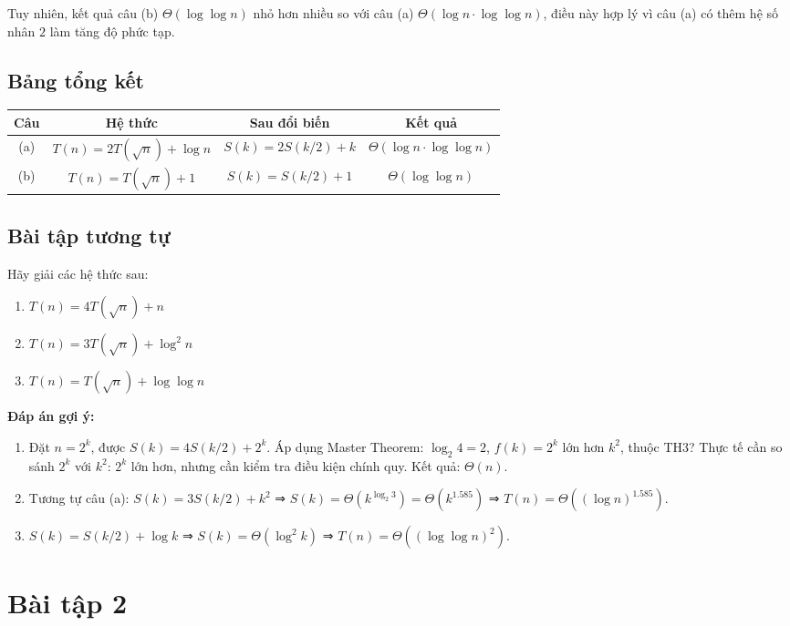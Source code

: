 \documentclass{article}
\begin{document}
Tuy nhiên, kết quả câu (b) \(\Theta(\log \log n)\) nhỏ hơn nhiều so với câu (a) \(\Theta(\log n \cdot \log \log n)\), điều này hợp lý vì câu (a) có thêm hệ số nhân \(2\) làm tăng độ phức tạp.

\subsection{Bảng tổng kết}

\begin{tabular}{|c|c|c|c|}
\hline
\textbf{Câu} & \textbf{Hệ thức} & \textbf{Sau đổi biến} & \textbf{Kết quả} \\
\hline
(a) & \(T(n) = 2T(\sqrt{n}) + \log n\) & \(S(k) = 2S(k/2) + k\) & \(\Theta(\log n \cdot \log \log n)\) \\
\hline
(b) & \(T(n) = T(\sqrt{n}) + 1\) & \(S(k) = S(k/2) + 1\) & \(\Theta(\log \log n)\) \\
\hline
\end{tabular}

\subsection{Bài tập tương tự}

Hãy giải các hệ thức sau:

\begin{enumerate}
    \item \(T(n) = 4T(\sqrt{n}) + n\)
    \item \(T(n) = 3T(\sqrt{n}) + \log^2 n\)
    \item \(T(n) = T(\sqrt{n}) + \log \log n\)
\end{enumerate}

\textbf{Đáp án gợi ý:}
\begin{enumerate}
    \item Đặt \(n = 2^k\), được \(S(k) = 4S(k/2) + 2^k\). Áp dụng Master Theorem: \(\log_2 4 = 2\), \(f(k) = 2^k\) lớn hơn \(k^2\), thuộc TH3? Thực tế cần so sánh \(2^k\) với \(k^2\): \(2^k\) lớn hơn, nhưng cần kiểm tra điều kiện chính quy. Kết quả: \(\Theta(n)\).
    \item Tương tự câu (a): \(S(k) = 3S(k/2) + k^2\) ⇒ \(S(k) = \Theta(k^{\log_2 3}) = \Theta(k^{1.585})\) ⇒ \(T(n) = \Theta((\log n)^{1.585})\).
    \item \(S(k) = S(k/2) + \log k\) ⇒ \(S(k) = \Theta(\log^2 k)\) ⇒ \(T(n) = \Theta((\log \log n)^2)\).
\end{enumerate}

\section{Bài tập 2}
\end{document}
